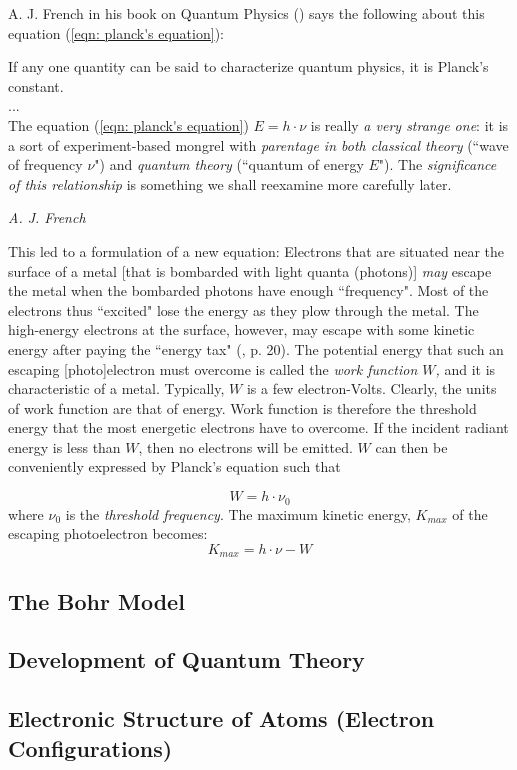 \documentclass{article}
\begin{document}
{A. J. French in his book on Quantum Physics (\cite{french-quantum-physics}) says the following about this equation (\ref{eqn: planck's equation}):

\epigraph
{
    If any one quantity can be said to characterize quantum physics, it is Planck's constant. \\
    ...\\
    The equation (\ref{eqn: planck's equation}) $E=h\cdot \nu$ is really \emph{a very strange one}: it is a sort of experiment-based mongrel with \emph{parentage in both classical theory} (``wave of frequency $\nu$") and \emph{quantum theory} (``quantum of energy $E$"). The \emph{significance of this relationship} is something we shall reexamine more carefully later.
}
{
    \textit{A. J. French \cite{french-quantum-physics}}
}

This led to a formulation of a new equation: Electrons that are situated near the surface of a metal [that is bombarded with light quanta (photons)] \emph{may} escape the metal when the bombarded photons have enough ``frequency". Most of the electrons thus ``excited" lose the energy as they plow through the metal. The high-energy electrons at the surface, however, may escape with some kinetic energy after paying the ``energy tax" (\cite{french-quantum-physics}, p. 20). The potential energy that such an escaping [photo]electron must overcome is called the \emph{work function $W$,} and it is characteristic of a metal. Typically, $W$ is a few electron-Volts. Clearly, the units of work function are that of energy. Work function is therefore the threshold energy that the most energetic electrons have to overcome. If the incident radiant energy is less than $W$, then no electrons will be emitted. $W$ can then be conveniently expressed by Planck's equation such that

$$
W = h\cdot \nu_0
$$
where $\nu_0$ is the \emph{threshold frequency}. The maximum kinetic energy, $K_{max}$ of the escaping photoelectron becomes:
$$
K_{max} = h\cdot \nu-W
$$

\subsection{The Bohr Model}
\subsection{Development of Quantum Theory}
\subsection{Electronic Structure of Atoms (Electron Configurations)}
}
\end{document}
